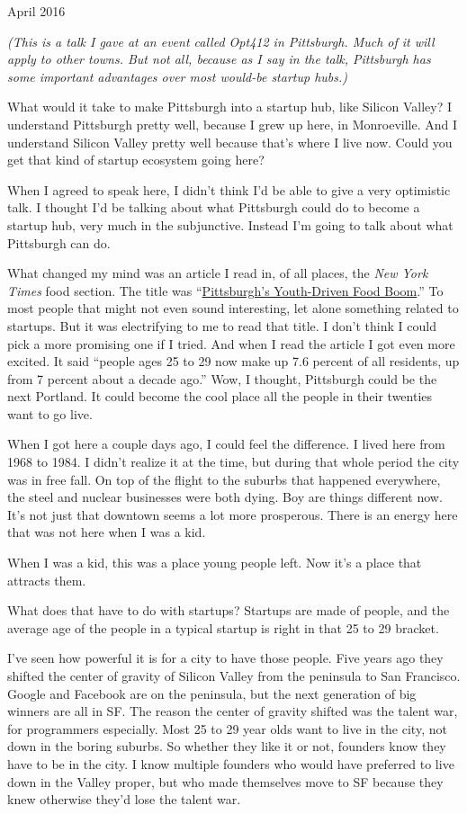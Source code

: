 April 2016

\emph{(This is a talk I gave at an event called Opt412 in Pittsburgh.
Much of it will apply to other towns. But not all, because as I say in
the talk, Pittsburgh has some important advantages over most would-be
startup hubs.)}

What would it take to make Pittsburgh into a startup hub, like Silicon
Valley? I understand Pittsburgh pretty well, because I grew up here, in
Monroeville. And I understand Silicon Valley pretty well because that's
where I live now. Could you get that kind of startup ecosystem going
here?

When I agreed to speak here, I didn't think I'd be able to give a very
optimistic talk. I thought I'd be talking about what Pittsburgh could do
to become a startup hub, very much in the subjunctive. Instead I'm going
to talk about what Pittsburgh can do.

What changed my mind was an article I read in, of all places, the
\emph{New York Times} food section. The title was
``\href{http://www.nytimes.com/2016/03/16/dining/pittsburgh-restaurants.html}{Pittsburgh's
Youth-Driven Food Boom}.'' To most people that might not even sound
interesting, let alone something related to startups. But it was
electrifying to me to read that title. I don't think I could pick a more
promising one if I tried. And when I read the article I got even more
excited. It said ``people ages 25 to 29 now make up 7.6 percent of all
residents, up from 7 percent about a decade ago.'' Wow, I thought,
Pittsburgh could be the next Portland. It could become the cool place
all the people in their twenties want to go live.

When I got here a couple days ago, I could feel the difference. I lived
here from 1968 to 1984. I didn't realize it at the time, but during that
whole period the city was in free fall. On top of the flight to the
suburbs that happened everywhere, the steel and nuclear businesses were
both dying. Boy are things different now. It's not just that downtown
seems a lot more prosperous. There is an energy here that was not here
when I was a kid.

When I was a kid, this was a place young people left. Now it's a place
that attracts them.

What does that have to do with startups? Startups are made of people,
and the average age of the people in a typical startup is right in that
25 to 29 bracket.

I've seen how powerful it is for a city to have those people. Five years
ago they shifted the center of gravity of Silicon Valley from the
peninsula to San Francisco. Google and Facebook are on the peninsula,
but the next generation of big winners are all in SF. The reason the
center of gravity shifted was the talent war, for programmers
especially. Most 25 to 29 year olds want to live in the city, not down
in the boring suburbs. So whether they like it or not, founders know
they have to be in the city. I know multiple founders who would have
preferred to live down in the Valley proper, but who made themselves
move to SF because they knew otherwise they'd lose the talent war.

